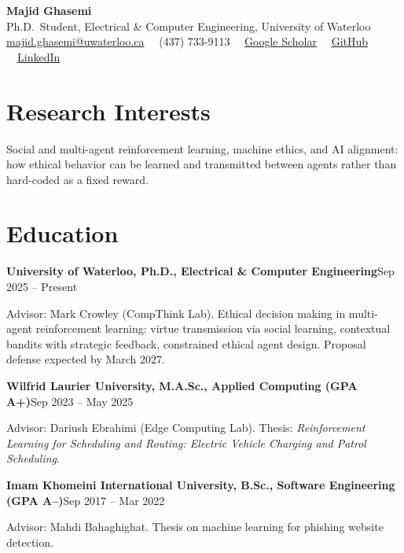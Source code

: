 \documentclass[letterpaper,11pt]{article}
\newcommand{\role}[2]{\textbf{#1}\hfill{#2}\par}
\newcommand{\gap}{\par\vspace{0.35em}}
\begin{document}
\begin{center}
  {\LARGE\bfseries Majid Ghasemi}\\[0.3em]
  {\footnotesize
   Ph.D.\ Student, Electrical \& Computer Engineering, University of Waterloo\\[0.25em]
   \href{mailto:majid.ghasemi@uwaterloo.ca}{majid.ghasemi@uwaterloo.ca}
   \ \textperiodcentered\ (437) 733-9113
   \ \textperiodcentered\ \href{https://scholar.google.com/citations?user=cHOAJEgAAAAJ&hl=en}{Google Scholar}
   \ \textperiodcentered\ \href{https://github.com/majidghassemi}{GitHub}
   \ \textperiodcentered\ \href{https://www.linkedin.com/in/majiddghasemi/}{LinkedIn}
  }
\end{center}

\section{Research Interests}
Social and multi-agent reinforcement learning, machine ethics, and AI alignment: how ethical behavior can be learned and transmitted between agents rather than hard-coded as a fixed reward.

\section{Education}
\role{University of Waterloo, Ph.D., Electrical \& Computer Engineering}{Sep 2025 -- Present}
Advisor: Mark Crowley (CompThink Lab). Ethical decision making in multi-agent reinforcement learning: virtue transmission via social learning, contextual bandits with strategic feedback, constrained ethical agent design. Proposal defense expected by March 2027.
\gap
\role{Wilfrid Laurier University, M.A.Sc., Applied Computing (GPA A+)}{Sep 2023 -- May 2025}
Advisor: Dariush Ebrahimi (Edge Computing Lab). Thesis: \textit{Reinforcement Learning for Scheduling and Routing: Electric Vehicle Charging and Patrol Scheduling}.
\gap
\role{Imam Khomeini International University, B.Sc., Software Engineering (GPA A--)}{Sep 2017 -- Mar 2022}
Advisor: Mahdi Bahaghighat. Thesis on machine learning for phishing website detection.
\end{document}
